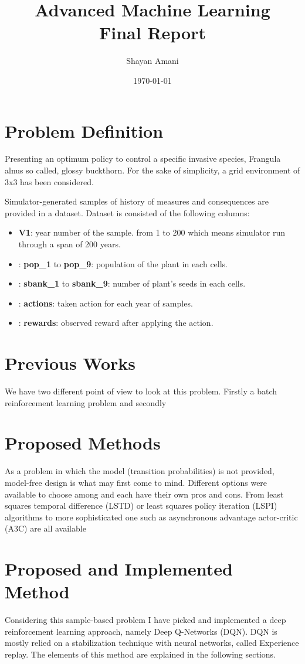 \documentclass[12pt]{report}
\title{Advanced Machine Learning\\Final Report}
\author{Shayan Amani}
\date{\today}
\begin{document}
\maketitle

\chapter{Problem Definition}
Presenting an optimum policy to control a specific invasive species, Frangula alnus so called, glossy buckthorn. For the sake of simplicity, a grid environment of 3x3 has been considered. 

Simulator-generated samples of history of measures and consequences are provided in a dataset. Dataset is consisted of the following columns:
\begin{itemize}
    \item \textbf{V1}: year number of the sample. from 1 to 200 which means simulator run through a span of 200 years.
    \item: \textbf{pop\_1} to \textbf{pop\_9}: population of the plant in each cells.
    \item: \textbf{sbank\_1} to \textbf{sbank\_9}: number of plant's seeds in each cells.
    \item: \textbf{actions}: taken action for each year of samples.
    \item: \textbf{rewards}: observed reward after applying the action.
\end{itemize}

\chapter{Previous Works}
We have two different point of view to look at this problem. Firstly a batch reinforcement learning problem and secondly 

\chapter{Proposed Methods}
As a problem in which the model (transition probabilities) is not provided, model-free design is what may first come to mind. Different options were available to choose among and each have their own pros and cons. From least squares temporal difference (LSTD) or least squares policy iteration (LSPI) algorithms to more sophisticated one such as asynchronous advantage actor-critic (A3C) \cite{Mnih2016b} are all available

\chapter{Proposed and Implemented Method}
Considering this sample-based problem I have picked and implemented a deep reinforcement learning approach, namely Deep Q-Networks (DQN). DQN is mostly relied on a stabilization technique with neural networks, called Experience replay.
 The elements of this method are explained in the following sections.
\end{document}
